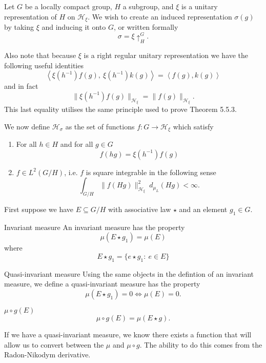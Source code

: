 \documentclass{article}
\begin{document}
Let $G$ be a locally compact group, $H$ a subgroup, and $\xi$ is a unitary representation of $H$ on $\mathcal{H}_{\xi}$. We wish to create an induced representation $\sigma(g)$ by taking $\xi$ and inducing it onto $G$, or written formally 
\[ 
    \sigma = \xi \uparrow^{G}_{H}  
.\] 

\begin{remark}
Also note that because $\xi$ is a right regular unitary representation we have the following useful identities
\[ 
    \left\langle \xi(h^{-1})f(g), \ \xi(h^{-1})k(g) \right\rangle = \left\langle f(g), k(g) \right\rangle 
\]
and in fact
\[ 
    \| \xi(h^{-1})f(g) \|_{\mathcal{H}_{\xi}} = \| f(g) \|_{\mathcal{H}_{\xi}} .
\]
This last equality utilises the same principle used to prove Theorem 5.5.3.
\end{remark}

We now define $\mathcal{H}_{\sigma}$ as the set of functions $f: G \rightarrow \mathcal{H}_{\xi}$ which satisfy
\begin{enumerate}
    \item For all $h \in H$ and for all $g \in G$ 
        \[ 
            f(hg) = \xi(h^{-1})f(g) 
        \]
    \item $f \in L^{2}(G/H)$, i.e. $f$ is square integrable in the following sense
        \[%
            \int_{G/H} \| f(Hg) \|^{2}_{\mathcal{H}_{\xi}} \ d_{\mu_{L}}(Hg) < \infty.
        \]%
\end{enumerate}

First suppose we have $E \subseteq G/H$ with associative law $\star$ and an element $g_1 \in G$.
\begin{Define}{Invariant measure}
    An invariant measure has the property 
    \[ 
        \mu(E \star g_1) = \mu(E) 
    \] 
    where 
    \[ 
        E \star g_1  = \{ e \star g_1 : \ e \in E \} 
    \]
\end{Define}
\begin{Define}{Quasi-invariant measure}
    Using the same objects in the defintion of an invariant measure, we define a quasi-invariant measure has the property 
    \[ 
        \mu(E \star g_1) =0 \iff \mu(E) = 0 .
    \]
\end{Define}

\begin{Define}{$\mu \circ g (E)$}
    \[%
        \mu \circ g(E) = \mu(E \star g) .
    \]%
\end{Define}

If we have a quasi-invariant measure, we know there exists a function that will allow us to convert between the $\mu$ and $\mu \circ g$. The ability to do this comes from the Radon-Nikodym derivative. 
\end{document}
